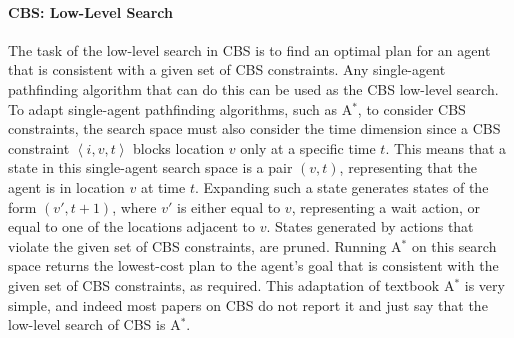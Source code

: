 \documentclass[review]{elsarticle}
\newcommand{\tuple}[1]{\ensuremath{\left \langle #1 \right \rangle }}
\newcommand\roni[1]{\nb{\textbf{Roni:}}{green}{#1}}
\newcommand\dor[1]{\nb{\textbf{Dor:}}{Fuchsia}{#1}}
\newcommand{\cbs}{\ac{CBS}\xspace}
\newcommand{\astar}{A$^*$\xspace}
\begin{document}




\paragraph{\textbf{\cbs: Low-Level Search}}
The task of the low-level search in \cbs is to find an optimal plan for an agent 
that is consistent with a given set of \cbs constraints. 
Any single-agent pathfinding algorithm that can do this can be used as the \cbs low-level search. 
To adapt single-agent pathfinding algorithms, such as \astar{}, to consider \cbs constraints, 
the search space must also consider the time dimension since a \cbs constraint $\tuple{i,v,t}$ 
blocks location $v$ only at a specific time $t$. 
This means that a state in this single-agent search space is a pair $(v,t)$, representing that the agent is in location $v$ at time $t$. Expanding such a state generates states 
of the form $(v',t+1)$, where $v'$ is either equal to $v$, representing a wait action, 
or equal to one of the locations adjacent to $v$. States generated by actions that violate the given set of \cbs constraints, are pruned. Running \astar{} on this search space returns the lowest-cost plan to the agent's goal that is consistent with the given set of \cbs constraints, as required. This adaptation of textbook \astar{} is very simple, and indeed most papers on \cbs do not report it and just say that the low-level search of \cbs is \astar{}. 
\end{document}

